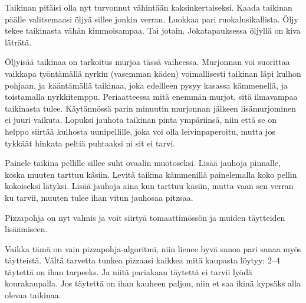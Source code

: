 \begin{recipe}
{	Taikinan pitäisi olla nyt turvonnut vähintään kaksinkertaiseksi. Kaada taikinan päälle 
	valitsemaasi öljyä sillee jonkin verran. Luokkaa pari ruokalusikallista. Öljy tekee taikinasta 
	vähän kimmoisampaa. Tai jotain. Jokatapauksessa öljyllä on kiva läträtä. 

	Öljyisää taikinaa on tarkoitus murjoa tässä vaiheessa. Murjonnan voi suorittaa vaikkapa työntämällä 
	nyrkin (vasemman käden) voimallisesti taikinan läpi kulhon pohjaan, ja kääntämällä taikinaa, joka
	edellleen pysyy kasassa kämmenellä, ja toistamalla nyrkkitemppu. Periaatteessa mitä enemmän murjot, 
	sitä ilmavampaa taikinasta tulee. Käytännössä parin minuutin murjonnan jälkeen lisämurjominen ei juuri 
	vaikuta. Lopuksi jauhota taikinan pinta ympäriinsä, niin että se on helppo siirtää kulhosta uunipellille, 
	joka voi olla leivinpaperoitu, mutta jos tykkäät hinkata peltiä puhtaaksi ni sit ei tarvi.

	Painele taikina pellille sillee suht ovaalin muotoseksi. Lisää jauhoja pinnalle, koska muuten tarttuu käsiin. 
	Levitä taikina kämmenillä painelemalla koko pellin kokoiseksi lätyksi. Lisää jauhoja aina kun tarttuu käsiin, 
	mutta vaan sen verran ku tarvii, muuten tulee ihan vitun jauhosaa pitzsaa.
	
	Pizzapohja on nyt valmis ja voit siirtyä tomaattimössön ja muiden täytteiden lisäämiseen.
	
	Vaikka tämä on vain pizzapohja-algoritmi, niin lienee hyvä sanoa pari sanaa myös täytteistä.
  Vältä tarvetta tunkea pizzaasi kaikkea mitä kaupasta 
	löytyy: 2--4 täytettä on ihan tarpeeks. Ja niitä pariakaan täytettä ei tarvii lyödä 
  kourakaupalla. Jos täytettä on ihan kauheen paljon, niin et saa ikinä kypsäks 
	alla olevaa taikinaa.
  }
    
    
\end{recipe}
